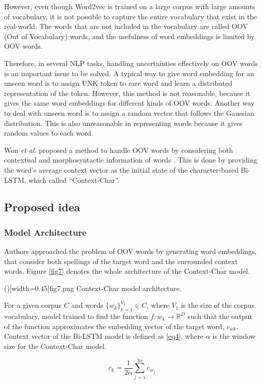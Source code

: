 \documentclass{ieeeaccess}
\begin{document}
However, even though Word2vec is trained on a large corpus with large amounts of vocabulary, it is not possible to capture the entire vocabulary that exist in the real-world.
The words that are not included in the vocabulary are called OOV (Out of Vocabulary) words, and the usefulness of word embeddings is limited by OOV words.

Therefore, in several NLP tasks, handling uncertainties effectively on OOV words is an important issue to be solved. A typical way to give word embedding for an unseen word is to assign UNK token to rare word and learn a distributed representation of the token. 
However, this method is not reasonable, because it gives the same word embeddings for different kinds of OOV words. 
Another way to deal with unseen word is to assign a random vector that follows the Gaussian distribution. 
This is also unreasonable in representing words because it gives random values to each word.

Won \textit{et al.} proposed a method to handle OOV words by considering both contextual and morphosyntactic information of words \cite{paper4}.
This is done by providing the word’s average context vector as the initial state of the character-based Bi-LSTM, which called ``Context-Char''.

\subsection{Proposed idea}
\subsubsection{Model Architecture}
Authors approached the problem of OOV words by generating word embeddings, that consider both spellings of the target word and the surrounded context words. 
Figure \ref{fig7} denotes the whole architecture of the Context-Char model.

\Figure[t]()[width=0.45\textwidth]{fig7.png}
   {Context-Char model architecture.\label{fig7}}

For a given corpus $C$ and words ${\{{w_k}\}}_{k=1}^{V_1} \in C$, where $V_1$ is the size of the corpus vocabulary, model trained to find the function $f: w_k \rightarrow \mathbb{R}^D$ such that the output of the function approximates the embedding vector of the target word, $e_{wk}$.
Context vector of the Bi-LSTM model is defined as \eqref{eq4}, where $\alpha$ is the window size for the Context-Char model.

\begin{equation}
	\label{eq4}
		c_k= \frac{1}{2\alpha}\sum_{j=1}^{2\alpha}{e_{w_j}}
\end{equation}
\end{document}
